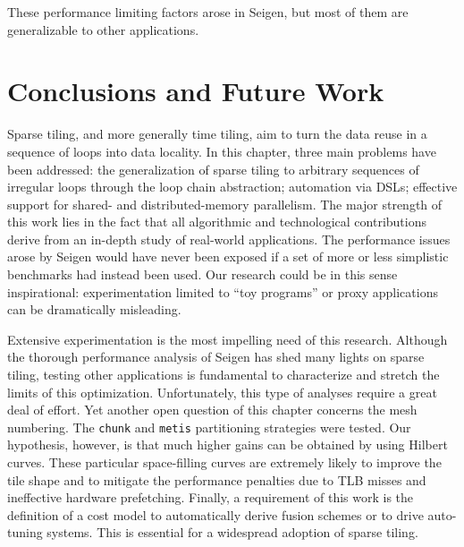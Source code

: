 These performance limiting factors arose in Seigen, but most of them are generalizable to other applications. 

\section{Conclusions and Future Work}
Sparse tiling, and more generally time tiling, aim to turn the data reuse in a sequence of loops into data locality. In this chapter, three main problems have been addressed: the generalization of sparse tiling to arbitrary sequences of irregular loops through the loop chain abstraction; automation via DSLs; effective support for shared- and distributed-memory parallelism. The major strength of this work lies in the fact that all algorithmic and technological contributions derive from an in-depth study of real-world applications. The performance issues arose by Seigen would have never been exposed if a set of more or less simplistic benchmarks had instead been used. Our research could be in this sense inspirational: experimentation limited to ``toy programs'' or proxy applications can be dramatically misleading.

Extensive experimentation is the most impelling need of this research. Although the thorough performance analysis of Seigen has shed many lights on sparse tiling, testing other applications is fundamental to characterize and stretch the limits of this optimization. Unfortunately, this type of analyses require a great deal of effort. Yet another open question of this chapter concerns the mesh numbering. The {\tt chunk} and {\tt metis} partitioning strategies were tested. Our hypothesis, however, is that much higher gains can be obtained by using Hilbert curves. These particular space-filling curves are extremely likely to improve the tile shape and to mitigate the performance penalties due to TLB misses and ineffective hardware prefetching. Finally, a requirement of this work is the definition of a cost model to automatically derive fusion schemes or to drive auto-tuning systems. This is essential for a widespread adoption of sparse tiling.

